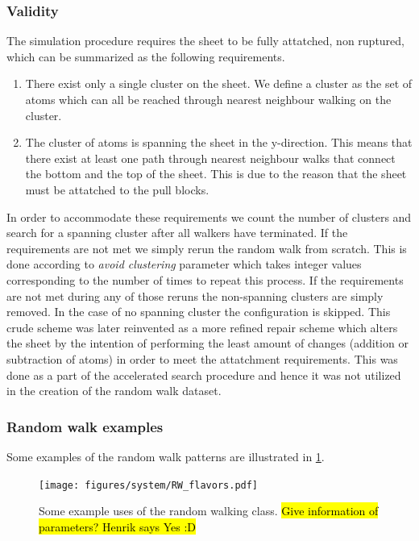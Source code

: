 \subsubsection{Validity}
The simulation procedure requires the sheet to be fully attatched, non ruptured, which can be summarized as the following requirements. 
\begin{enumerate}
  \item There exist only a single cluster on the sheet. We define a cluster as the set of atoms which can all be reached through nearest neighbour walking on the cluster.
  \item The cluster of atoms is spanning the sheet in the y-direction. This means that there exist at least one path through nearest neighbour walks that connect the bottom and the top of the sheet. This is due to the reason that the sheet must be attatched to the pull blocks.
\end{enumerate}
In order to accommodate these requirements we count the number of clusters and search for a spanning cluster after all walkers have terminated. If the requirements are not met we simply rerun the random walk from scratch. This is done according to \textit{avoid clustering} parameter which takes integer values corresponding to the number of times to repeat this process. If the requirements are not met during any of those reruns the non-spanning clusters are simply removed. In the case of no spanning cluster the configuration is skipped. This crude scheme was later reinvented as a more refined repair scheme which alters the sheet by the intention of performing the least amount of changes (addition or subtraction of atoms) in order to meet the attatchment requirements. This was done as a part of the accelerated search procedure and hence it was not utilized in the creation of the random walk dataset. 

\subsubsection{Random walk examples}

Some examples of the random walk patterns are illustrated in \cref{fig:RW_flavors}.

\begin{figure}[H]
  \centering
  \texttt{[image: figures/system/RW\_flavors.pdf]}
  \caption{Some example uses of the random walking class. \hl{Give information of parameters? Henrik says Yes :D}}
  \label{fig:RW_flavors}
\end{figure}
